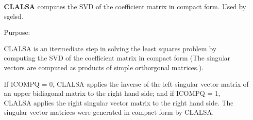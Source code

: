 {\bfseries C\+L\+A\+L\+S\+A} computes the S\+V\+D of the coefficient matrix in compact form. Used by sgelsd. 

 \begin{DoxyParagraph}{Purpose\+: }
\begin{DoxyVerb} CLALSA is an itermediate step in solving the least squares problem
 by computing the SVD of the coefficient matrix in compact form (The
 singular vectors are computed as products of simple orthorgonal
 matrices.).

 If ICOMPQ = 0, CLALSA applies the inverse of the left singular vector
 matrix of an upper bidiagonal matrix to the right hand side; and if
 ICOMPQ = 1, CLALSA applies the right singular vector matrix to the
 right hand side. The singular vector matrices were generated in
 compact form by CLALSA.\end{DoxyVerb}
 
\end{DoxyParagraph}

